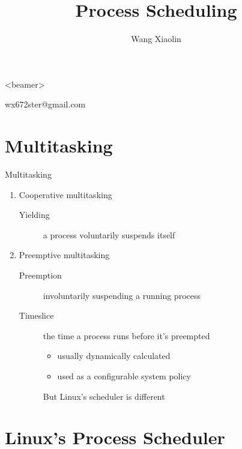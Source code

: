\begin{frame}<beamer>
  \title{Process Scheduling}
  \author{Wang Xiaolin}
  \titlepage
  \vfill
  \tiny{
     wx672ster@gmail.com
  }
\end{frame}

\section{Multitasking}
\label{sec:multitasking}

\begin{frame}{Multitasking}
  \begin{enumerate}
  \item Cooperative multitasking
    \begin{description}
    \item[Yielding] a process voluntarily suspends itself
    \end{description}
  \item Preemptive multitasking
    \begin{description}
    \item[Preemption] involuntarily suspending a running process
    \item[Timeslice] the time a process runs before it's preempted
      \begin{itemize}
      \item usually dynamically calculated
      \item used as a configurable system policy
      \end{itemize}
      But Linux's scheduler is different
    \end{description}
  \end{enumerate}
\end{frame}

\section{Linux's Process Scheduler}
\label{sec:linuxs-proc-sched}

